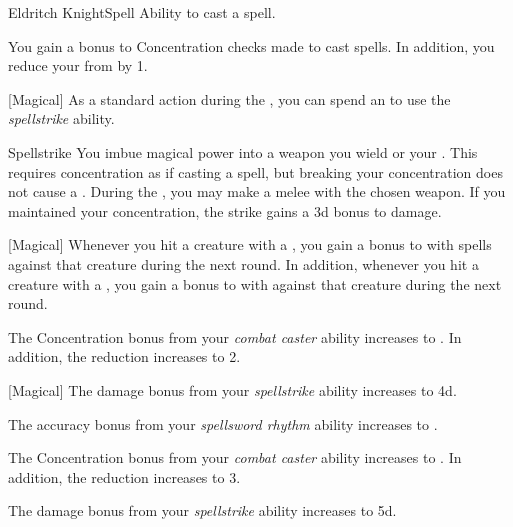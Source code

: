     \begin{feat}{Eldritch Knight}{Spell}
        \featpre Ability to cast a spell.

         You gain a  bonus to Concentration checks made to cast spells.
        In addition, you reduce your  from  by 1.

        [Magical] As a standard action during the , you can spend an  to use the \textit{spellstrike} ability.
        \begin{ability}{Spellstrike}
            You imbue magical power into a weapon you wield or your .
            This requires concentration as if casting a spell, but breaking your concentration does not cause a .
            During the , you may make a melee  with the chosen weapon.
            If you maintained your concentration, the strike gains a \plus3d bonus to damage.
        \end{ability}

        [Magical] Whenever you hit a creature with a , you gain a  bonus to  with spells against that creature during the next round.
        In addition, whenever you hit a creature with a , you gain a  bonus to  with  against that creature during the next round.

         The Concentration bonus from your \textit{combat caster} ability increases to .
        In addition, the  reduction increases to 2.

        [Magical] The damage bonus from your \textit{spellstrike} ability increases to \plus4d.

         The accuracy bonus from your \textit{spellsword rhythm} ability increases to .

         The Concentration bonus from your \textit{combat caster} ability increases to .
        In addition, the  reduction increases to 3.

         The damage bonus from your \textit{spellstrike} ability increases to \plus5d.
    \end{feat}

